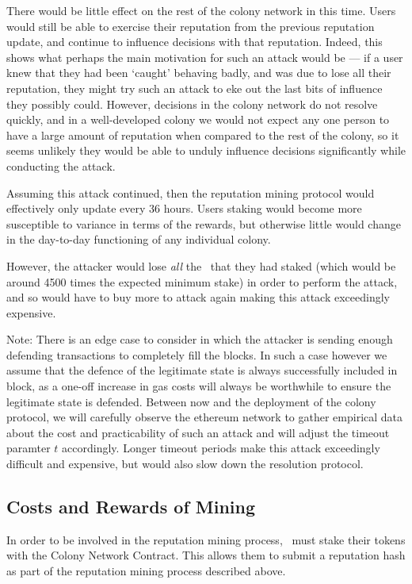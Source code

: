 There would be little effect on the rest of the colony network in this time. Users would still be able to exercise their reputation from the previous reputation update, and continue to influence decisions with that reputation. Indeed, this shows what perhaps the main motivation for such an attack would be --- if a user knew that they had been `caught' behaving badly, and was due to lose all their reputation, they might try such an attack to eke out the last bits of influence they possibly could. However, decisions in the colony network do not resolve quickly, and in a well-developed colony we would not expect any one person to have a large amount of reputation when compared to the rest of the colony, so it seems unlikely they would be able to unduly influence decisions significantly while conducting the attack.

Assuming this attack continued, then the reputation mining protocol would effectively only update every 36 hours. Users staking would become more susceptible to variance in terms of the rewards, but otherwise little would change in the day-to-day functioning of any individual colony. 

However, the attacker would lose \emph{all} the \rct\ that they had staked (which would be around 4500 times the expected minimum stake) in order to perform the attack, and so would have to buy more to attack again making this attack exceedingly expensive.


Note: There is an edge case to consider in which the attacker is sending enough defending transactions to completely fill the blocks. In such a case however we assume that the defence of the legitimate state is always successfully included in block, as a one-off increase in gas costs will always be worthwhile to ensure the legitimate state is defended. Between now and the deployment of the colony protocol, we will carefully observe the ethereum network to gather empirical data about the cost and practicability of such an attack and will adjust the timeout paramter $t$ accordingly. Longer timeout periods make this attack exceedingly difficult and expensive, but would also slow down the resolution protocol.

\subsection{Costs and Rewards of Mining}\label{subsec:mining-costs-and-rewards}
In order to be involved in the reputation mining process, \rcths\ must stake their tokens with the Colony Network Contract. This allows them to submit a reputation hash as part of the reputation mining process described above.

